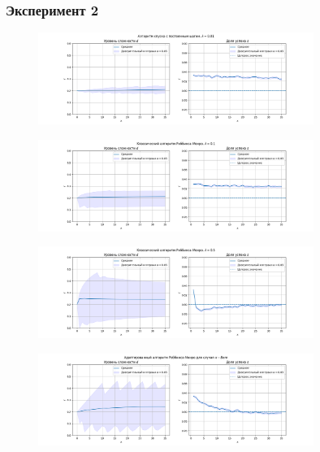 \subsubsection{Эксперимент 2}
\begin{figure}[h!]
    \centering
    \includegraphics[width=0.8\textwidth]{assets/work/rating/2/fixed.png}
    \label{exp2:fixed}
\end{figure}
\begin{figure}[h!]
    \centering
    \includegraphics[width=0.8\textwidth]{assets/work/rating/2/lambda_0.1.png}
    \label{exp2:lambda_0.1}
\end{figure}
\begin{figure}[h!]
    \centering
    \includegraphics[width=0.8\textwidth]{assets/work/rating/2/lambda_0.5.png}
    \label{exp2:lambda_0.5}
\end{figure}
\begin{figure}[h!]
    \centering
    \includegraphics[width=0.8\textwidth]{assets/work/rating/2/adaptive.png}
    \label{exp2:adaptive}
\end{figure}
\pagebreak
